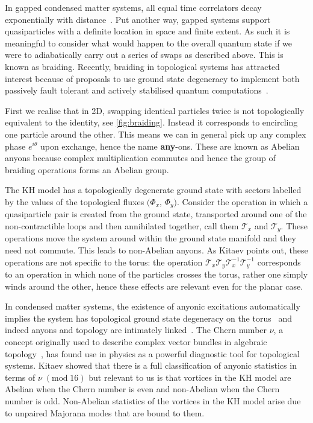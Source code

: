 In gapped condensed matter systems, all equal time correlators decay exponentially with distance~\autocite{hastingsLiebSchultzMattisHigherDimensions2004}. Put another way, gapped systems support quasiparticles with a definite location in space and finite extent. As such it is meaningful to consider what would happen to the overall quantum state if we were to adiabatically carry out a series of swaps as described above. This is known as braiding. Recently, braiding in topological systems has attracted interest because of proposals to use ground state degeneracy to implement both passively fault tolerant and actively stabilised quantum computations~\autocite{kitaev_fault-tolerant_2003,poulinStabilizerFormalismOperator2005,hastingsDynamicallyGeneratedLogical2021}.

First we realise that in 2D, swapping identical particles twice is not topologically equivalent to the identity, see \cref{fig:braiding}. Instead it corresponds to encircling one particle around the other. This means we can in general pick up any complex phase \(e^{i\theta}\) upon exchange, hence the name \textbf{any}-ons. These are known as Abelian anyons because complex multiplication commutes and hence the group of braiding operations forms an Abelian group.

The KH model has a topologically degenerate ground state with sectors labelled by the values of the topological fluxes \((\Phi_x\), \(\Phi_y)\). Consider the operation in which a quasiparticle pair is created from the ground state, transported around one of the non-contractible loops and then annihilated together, call them \(\mathcal{T}_{x}\) and \(\mathcal{T}_{y}\). These operations move the system around within the ground state manifold and they need not commute. This leads to non-Abelian anyons. As Kitaev points out, these operations are not specific to the torus: the operation \(\mathcal{T}_{x}\mathcal{T}_{y}\mathcal{T}_{x}^{-1}\mathcal{T}_{y}^{-1}\) corresponds to an operation in which none of the particles crosses the torus, rather one simply winds around the other, hence these effects are relevant even for the planar case.

In condensed matter systems, the existence of anyonic excitations automatically implies the system has topological ground state degeneracy on the torus~\autocite{einarssonFractionalStatisticsTorus1990} and indeed anyons and topology are intimately linked~\autocite{oshikawaTopologicalDegeneracyNonAbelian2007,Chung_Topological_quantum2010,yaoAlgebraicSpinLiquid2009}. The Chern number \(\nu\), a concept originally used to describe complex vector bundles in algebraic topology~\autocite{chernCharacteristicClassesHermitian1946}, has found use in physics as a powerful diagnostic tool for topological systems. Kitaev showed that there is a full classification of anyonic statistics in terms of \(\nu\;(\mathrm{mod}\;16)\) but relevant to us is that vortices in the KH model are Abelian when the Chern number is even and non-Abelian when the Chern number is odd. Non-Abelian statistics of the vortices in the KH model arise due to unpaired Majorana modes that are bound to them.

